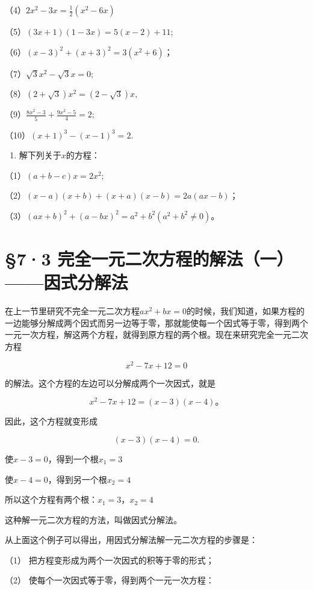 （4）\(2x^{2} - 3x = \frac{1}{2} (x^{2} - 6x)\)

（5）\((3x + 1)(1 - 3x) = 5(x - 2) + 11;\)

（6）\((x - 3)^{2} + (x + 3)^{2} = 3(x^{2} + 6)\)；

（7）\(\sqrt{3} x^{2} - \sqrt{3} x = 0;\)

（8）\((2 + \sqrt{3})x^{2} = (2 - \sqrt{3})x,\)

（9）\(\frac{8x^2 - 3}{5} + \frac{9x^2 - 5}{4} = 2;\)

（10）\((x + 1)^{3} - (x - 1)^{3} = 2.\)

\begin{enumerate}[start=5]
\item
  解下列关于\(x\)的方程：
\end{enumerate}

（1）\((a + b - c)x = 2x^2;\)

（2）\((x - a)(x + b) + (x + a)(x - b) = 2a(ax - b)\)；

（3）\((ax + b)^2 + (a - bx)^2 = a^2 + b^2 (a^2 + b^2 \neq 0)\)。

\section{§7·3 完全一元二次方程的解法（一）------因式分解法}

在上一节里研究不完全一元二次方程\(ax^2 + bx = 0\)的时候，我们知道，如果方程的一边能够分解成两个因式而另一边等于零，那就能使每一个因式等于零，得到两个一元一次方程，解这两个方程，就得到原方程的两个根。现在来研究完全一元二次方程

\[
x ^ {2} - 7 x + 12 = 0
\]

的解法。这个方程的左边可以分解成两个一次因式，就是

\[
x ^ {2} - 7 x + 12 = (x - 3) (x - 4)\text{。}
\]

因此，这个方程就变形成

\[
(x - 3) (x - 4) = 0.
\]

使\(x - 3 = 0\)，得到一个根\(x_{1} = 3\)

使\(x - 4 = 0\)，得到另一个根\(x_{2} = 4\)

所以这个方程有两个根：\(x_{1} = 3\)，\(x_{2} = 4\)

这种解一元二次方程的方法，叫做因式分解法。

从上面这个例子可以得出，用因式分解法解一元二次方程的步骤是：

（1） 把方程变形成为两个一次因式的积等于零的形式；

（2） 使每个一次因式等于零，得到两个一元一次方程：

